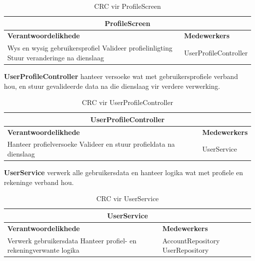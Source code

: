 \begin{table}[H]
\centering
\begin{tabular}{|p{}|p{}|}
    \hline
    \multicolumn{2}{|c|}{\textbf{ProfileScreen}} \\
    \hline
    \textbf{Verantwoordelikhede} & \textbf{Medewerkers} \\
    \hline
    Wys en wysig gebruikersprofiel \newline
    Valideer profielinligting \newline
    Stuur veranderinge na dienslaag
    &
    UserProfileController \\
    \hline
\end{tabular}
\caption{CRC vir ProfileScreen}
\label{tab:crc_profile_screen}
\end{table}
\vspace{1em}

\textbf{UserProfileController} hanteer versoeke wat met gebruikersprofiele verband hou, en stuur gevalideerde data na die dienslaag vir verdere verwerking.

\begin{table}[H]
\centering
\begin{tabular}{|p{}|p{}|}
    \hline
    \multicolumn{2}{|c|}{\textbf{UserProfileController}} \\
    \hline
    \textbf{Verantwoordelikhede} & \textbf{Medewerkers} \\
    \hline
    Hanteer profielversoeke \newline
    Valideer en stuur profieldata na dienslaag
    &
    UserService \\
    \hline
\end{tabular}
\caption{CRC vir UserProfileController}
\label{tab:crc_user_profile_controller}
\end{table}
\vspace{1em}

\textbf{UserService} verwerk alle gebruikersdata en hanteer logika wat met profiele en rekeninge verband hou.

\begin{table}[H]
\centering
\begin{tabular}{|p{}|p{}|}
    \hline
    \multicolumn{2}{|c|}{\textbf{UserService}} \\
    \hline
    \textbf{Verantwoordelikhede} & \textbf{Medewerkers} \\
    \hline
    Verwerk gebruikersdata \newline
    Hanteer profiel- en rekeningverwante logika
    &
    AccountRepository  \newline
    UserRepository \\
    \hline
\end{tabular}
\caption{CRC vir UserService}
\label{tab:crc_user_service}
\end{table}
\vspace{1em}

